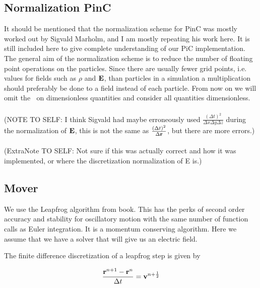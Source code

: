     \subsection{Normalization PinC}
        It should be mentioned that the normalization scheme for PinC was mostly worked
        out by Sigvald Marholm, and I am mostly repeating his work here. It is still
        included here to give complete understanding of our PiC implementation.
        The general aim of the normalization scheme is to reduce the number of
        floating point operations on the particles. Since there are usually
        fewer grid points, i.e. values for fields such as \(\rho\) and \(\vb{E}\),
        than particles in a simulation a multiplication should preferably be done to
        a field instead of each particle. From now on we will omit the \(~\) on dimensionless
        quantities and consider all quantities dimensionless.
\\ \\
        (NOTE TO SELF: I think Sigvald had maybe erroneously used \(\frac{(\Delta t)^2}{\Delta x \Delta y \Delta z}\) during the normalization of
        \(\vb{E}\), this is not the same as \(\frac{(\Delta t)^2}{\Delta \vb{r}}\), but there are more errors.)
        \\ \\(ExtraNote TO SELF: Not sure if this was actually correct and how it was implemented, or
        where the discretization normalization of E is.)

        \subsection{Mover}
            We use the Leapfrog algorithm from \textit{} \citep{birdsall_plasma_2004}
            book. This has the perks of second order accuracy and stability for oscillatory motion
            with the same number of function calls as Euler integration. It is
            a momentum conserving algorithm. Here we assume that we have a solver
            that will give us an electric field.

            The finite difference discretization of a leapfrog step is given by

            \begin{equation}
                \frac{\vb{r}^{n+1}-\vb{r}^n}{\Delta t} = \vb{v}^{n+\frac{1}{2}}
            \end{equation}
